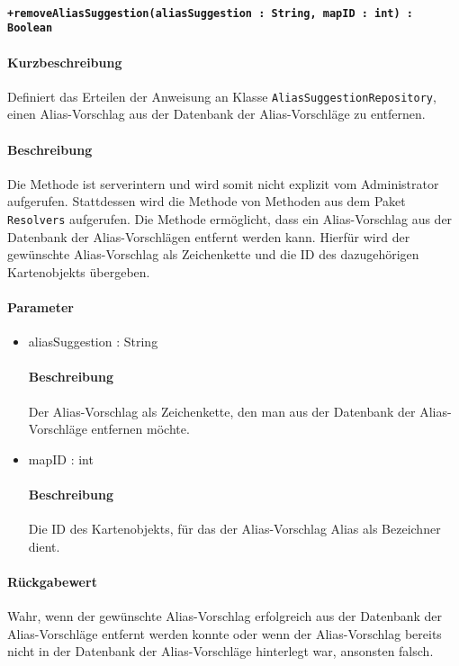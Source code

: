 \paragraph*{\texttt{+removeAliasSuggestion(aliasSuggestion : String, mapID : int) : Boolean}}%
\paragraph*{Kurzbeschreibung}
Definiert das Erteilen der Anweisung an Klasse \texttt{AliasSuggestionRepository}, einen Alias-Vorschlag aus der Datenbank der Alias-Vorschläge zu entfernen.
\paragraph*{Beschreibung}
Die Methode ist serverintern und wird somit nicht explizit vom Administrator aufgerufen.
Stattdessen wird die Methode von Methoden aus dem Paket \texttt{Resolvers} aufgerufen.
Die Methode ermöglicht, dass ein Alias-Vorschlag aus der Datenbank der Alias-Vorschlägen entfernt werden kann.
Hierfür wird der gewünschte Alias-Vorschlag als Zeichenkette und die ID des dazugehörigen Kartenobjekts übergeben.
\paragraph*{Parameter}
\begin{itemize}
    \item aliasSuggestion : String
    		\paragraph*{Beschreibung}
    		Der Alias-Vorschlag als Zeichenkette, den man aus der Datenbank der Alias-Vorschläge entfernen möchte.
    \item mapID : int
    		\paragraph*{Beschreibung}
    		Die ID des Kartenobjekts, für das der Alias-Vorschlag Alias als Bezeichner dient.
\end{itemize}
\paragraph*{Rückgabewert}
Wahr, wenn der gewünschte Alias-Vorschlag erfolgreich aus der Datenbank der Alias-Vorschläge entfernt werden konnte oder wenn der Alias-Vorschlag bereits nicht in der Datenbank der Alias-Vorschläge hinterlegt war, ansonsten falsch.
